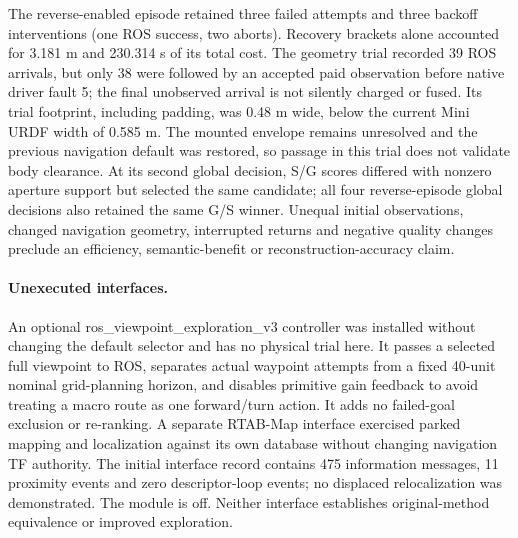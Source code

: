 The reverse-enabled episode retained three failed attempts and three backoff interventions (one ROS success, two aborts). Recovery brackets alone accounted for 3.181 m and 230.314 s of its total cost. The geometry trial recorded 39 ROS arrivals, but only 38 were followed by an accepted paid observation before native driver fault 5; the final unobserved arrival is not silently charged or fused. Its trial footprint, including padding, was 0.48 m wide, below the current Mini URDF width of 0.585 m. The mounted envelope remains unresolved and the previous navigation default was restored, so passage in this trial does not validate body clearance. At its second global decision, S/G scores differed with nonzero aperture support but selected the same candidate; all four reverse-episode global decisions also retained the same G/S winner. Unequal initial observations, changed navigation geometry, interrupted returns and negative quality changes preclude an efficiency, semantic-benefit or reconstruction-accuracy claim.

\paragraph{Unexecuted interfaces.}
An optional ros\_viewpoint\_exploration\_v3 controller was installed without changing the default selector and has no physical trial here. It passes a selected full viewpoint to ROS, separates actual waypoint attempts from a fixed 40-unit nominal grid-planning horizon, and disables primitive gain feedback to avoid treating a macro route as one forward/turn action. It adds no failed-goal exclusion or re-ranking. A separate RTAB-Map interface exercised parked mapping and localization against its own database without changing navigation TF authority. The initial interface record contains 475 information messages, 11 proximity events and zero descriptor-loop events; no displaced relocalization was demonstrated. The module is off. Neither interface establishes original-method equivalence or improved exploration.
